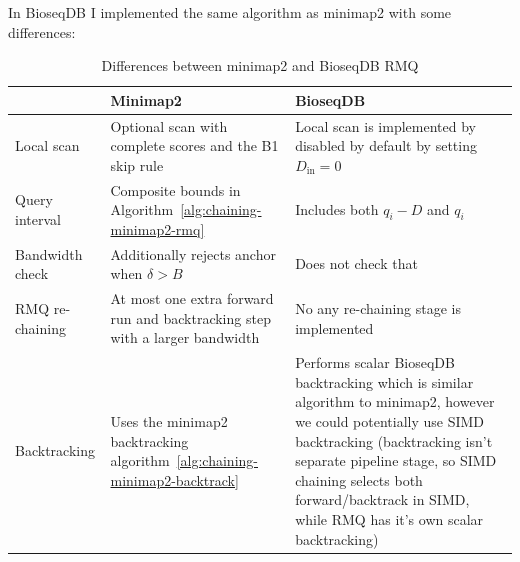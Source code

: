 In BioseqDB I implemented the same algorithm as minimap2 with some differences:

\begin{table}[H]
\centering
\caption{Differences between minimap2 and BioseqDB RMQ}
\label{tab:chaining-bioseqdb-rmq-differences}
\small
\setlength{\tabcolsep}{4pt}
\renewcommand{\arraystretch}{1.12}
\begin{tabularx}{\linewidth}{@{}
  >{\raggedright\arraybackslash}p{.19\linewidth}
  >{\raggedright\arraybackslash}X
  >{\raggedright\arraybackslash}X@{}}
\toprule
 & \textbf{Minimap2} & \textbf{BioseqDB}\\
\midrule
Local scan & Optional scan with complete scores and the B1 skip rule
  & Local scan is implemented by disabled by default by setting \(D_{\mathrm{in}}=0\)\\
\addlinespace
Query interval & Composite bounds in
  Algorithm~\ref{alg:chaining-minimap2-rmq}
  & Includes both \(q_i-D\) and \(q_i\)\\
\addlinespace
Bandwidth check & Additionally rejects anchor when \(\delta>B\)
  & Does not check that \\
\addlinespace
RMQ re-chaining & At most one extra forward run and backtracking step
  with a larger bandwidth & No any re-chaining stage is implemented \\
\addlinespace
Backtracking & Uses the minimap2 backtracking algorithm~\ref{alg:chaining-minimap2-backtrack}
  & Performs scalar BioseqDB backtracking which is similar algorithm to minimap2, however we could potentially use SIMD backtracking (backtracking isn't separate pipeline stage, so SIMD chaining selects both forward/backtrack in SIMD, while RMQ has it's own scalar backtracking)\\
\bottomrule
\end{tabularx}
\end{table}


